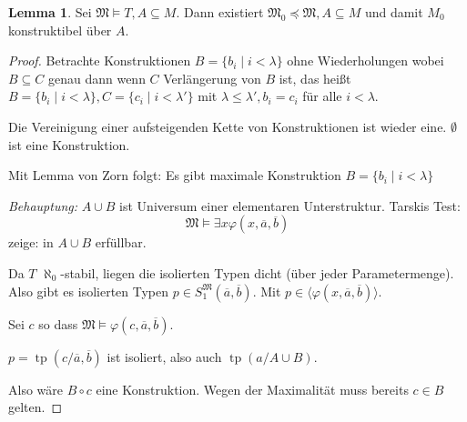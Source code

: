 \documentclass[12pt,parskip=full]{scrartcl}
\theoremstyle{definition}
\newtheorem{lemma}[theorem]{Lemma}
\begin{document}
 	\begin{lemma}
 		Sei $\mathfrak{M} \models T, A \subseteq M$. Dann existiert $\mathfrak{M_0} \preccurlyeq \mathfrak{M}, A \subseteq M$ und damit $M_0$ konstruktibel über $A$.
 	\end{lemma}
 
 	\begin{proof}
 		Betrachte Konstruktionen $B = \{ b_i \mid i < \lambda \}$ ohne Wiederholungen wobei $B \subseteq C$ genau dann wenn $C$ Verlängerung von $B$ ist, das heißt $B = \{ b_i \mid i < \lambda \}, C = \{ c_i \mid i < \lambda' \}$ mit $\lambda \leq \lambda', b_i = c_i$ für alle $i < \lambda$.
 		
 		Die Vereinigung einer aufsteigenden Kette von Konstruktionen ist wieder eine. $\emptyset$ ist eine Konstruktion.
 		
 		Mit Lemma von Zorn folgt: Es gibt maximale Konstruktion $B = \{ b_i \mid i < \lambda \}$
 		
 		\textit{Behauptung:} $A \cup B$ ist Universum einer elementaren Unterstruktur. Tarskis Test:
 		\begin{equation*}
	 		\mathfrak{M} \models \exists x \varphi(x, \overline{a}, \overline{b})
 		\end{equation*}
 		zeige: in $A \cup B$ erfüllbar.
 		
 		Da $T$ $\aleph_0$-stabil, liegen die isolierten Typen dicht (über jeder Parametermenge). Also gibt es isolierten Typen $p \in S_1^\mathfrak{M}(\overline{a}, \overline{b})$. Mit $p \in \langle \varphi(x, \overline{a}, \overline{b}) \rangle$.
 		
 		Sei $c$ so dass $\mathfrak{M} \models \varphi(c, \overline{a}, \overline{b})$.
 		
 		$p = \operatorname{tp}(c/ \overline{a}, \overline{b})$ ist isoliert, also auch $\operatorname{tp}(a / A \cup B)$.
 		
 		Also wäre $B \circ c$ eine Konstruktion. Wegen der Maximalität muss bereits $c \in B$ gelten.
 	\end{proof}
\end{document}
